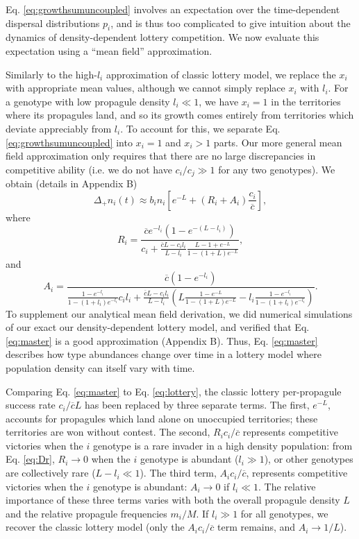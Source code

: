 \documentclass[11pt]{article}
\begin{document}
Eq. \eqref{eq:growthsumuncoupled} involves an expectation over the time-dependent dispersal distributions $p_i$, and is thus too complicated to give intuition about the dynamics of density-dependent lottery competition. We now evaluate this expectation using a ``mean field'' approximation. 

Similarly to the high-$l_i$ approximation of classic lottery model, we replace the $x_i$ with appropriate mean values, although we cannot simply replace $x_i$ with $l_i$. For a genotype with low propagule density $l_i\ll 1$, we have $x_i=1$ in the territories where its propagules land, and so its growth comes entirely from territories which deviate appreciably from $l_i$. To account for this, we separate Eq. \eqref{eq:growthsumuncoupled} into $x_i=1$ and $x_i>1$ parts. Our more general mean field approximation only requires that there are no large discrepancies in competitive ability (i.e. we do not have $c_i/c_j\gg 1$ for any two genotypes). We obtain (details in Appendix B)
\begin{equation}
\Delta_+ n_i(t)\approx b_i n_i\left[e^{-L}+(R_i+A_i)\frac{c_i}{\overline{c}}\right], \label{eq:master}
\end{equation}
where
\begin{equation}
R_i=\frac{\overline{c}e^{-l_i}(1-e^{-(L-l_i)})}{c_i +\frac{\overline{c}L- c_il_i}{L-l_i}\frac{L-1+e^{-L}}{1-(1+L)e^{-L}}},\label{eq:Dr}
\end{equation}
and
\begin{equation}
A_i=\frac{\overline{c}(1-e^{-l_i})}{\frac{1-e^{-l_i}}{1-(1+l_i)e^{-l_i}}c_il_i+\frac{\overline{c}L- c_il_i}{L-l_i}\left(L\frac{1-e^{-L}}{1-(1+L)e^{-L}}-l_i\frac{1-e^{-l_i}}{1-(1+l_i)e^{-l_i}}\right)}.\label{eq:Da}
\end{equation}
To supplement our analytical mean field derivation, we did numerical simulations of our exact our density-dependent lottery model, and verified  that Eq. \eqref{eq:master} is a good approximation (Appendix B). Thus, Eq. \eqref{eq:master} describes how type abundances change over time in a lottery model where population density can itself vary with time.

Comparing Eq. \eqref{eq:master} to Eq. \eqref{eq:lottery}, the classic lottery per-propagule success rate $c_i/\overline{c}L$ has been replaced by three separate terms. The first, $e^{-L}$, accounts for propagules which land alone on unoccupied territories; these territories are won without contest. The second, $R_i c_i/\overline{c}$ represents competitive victories when the $i$ genotype is a rare invader in a high density population: from Eq. \eqref{eq:Dr}, $R_i\rightarrow 0$ when the $i$ genotype is abundant ($l_i\gg 1$), or other genotypes are collectively rare ($L-l_i\ll 1$). The third term, $A_ic_i/\overline{c}$, represents competitive victories when the $i$ genotype is abundant: $A_i\rightarrow 0$ if $l_i\ll 1$. The relative importance of these three terms varies with both the overall propagule density $L$ and the relative propagule frequencies $m_i/M$. If $l_i\gg 1$ for all genotypes, we recover the classic lottery model (only the $A_ic_i/\overline{c}$ term remains, and $A_i\rightarrow 1/L$). 
\end{document}
